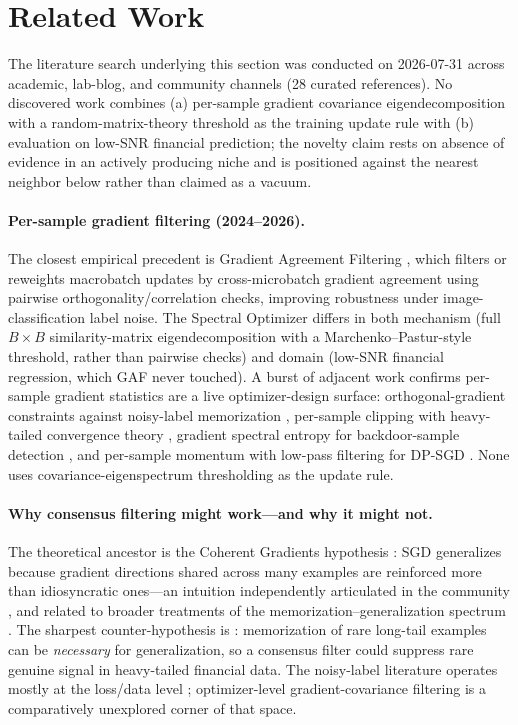 \section{Related Work}
\label{sec:related-work}

The literature search underlying this section was conducted on 2026-07-31
across academic, lab-blog, and community channels (28 curated references).
No discovered work combines (a) per-sample gradient covariance
eigendecomposition with a random-matrix-theory threshold as the training
update rule with (b) evaluation on low-SNR financial prediction; the novelty
claim rests on absence of evidence in an actively producing niche and is
positioned against the nearest neighbor below rather than claimed as a
vacuum.

\paragraph{Per-sample gradient filtering (2024--2026).}
The closest empirical precedent is Gradient Agreement Filtering
\citep{chaubard2024gradientagreementfiltering}, which filters or reweights
macrobatch updates by cross-microbatch gradient agreement using pairwise
orthogonality/correlation checks, improving robustness under
image-classification label noise. The Spectral Optimizer differs in both
mechanism (full $B \times B$ similarity-matrix eigendecomposition with a
Marchenko--Pastur-style threshold, rather than pairwise checks) and domain
(low-SNR financial regression, which GAF never touched). A burst of adjacent
work confirms per-sample gradient statistics are a live optimizer-design
surface: orthogonal-gradient constraints against noisy-label memorization
\citep{mai2026orthogonalgradient}, per-sample clipping with heavy-tailed
convergence theory \citep{nobile2026persampleclipping}, gradient spectral
entropy for backdoor-sample detection \citep{zhao2026gradsentry}, and
per-sample momentum with low-pass filtering for DP-SGD \citep{xu2025dppmlf}.
None uses covariance-eigenspectrum thresholding as the update rule.

\paragraph{Why consensus filtering might work---and why it might not.}
The theoretical ancestor is the Coherent Gradients hypothesis
\citep{chatterjee2020coherentgradients}: SGD generalizes because gradient
directions shared across many examples are reinforced more than
idiosyncratic ones---an intuition independently articulated in the community
\citep{pope2022general_circuits}, and related to broader treatments of the
memorization--generalization spectrum \citep{vaintrob2025memorization}. The
sharpest counter-hypothesis is \citet{feldman2019longtailmemorization}:
memorization of rare long-tail examples can be \emph{necessary} for
generalization, so a consensus filter could suppress rare genuine signal in
heavy-tailed financial data. The noisy-label literature operates mostly at
the loss/data level \citep{liu2020earlylearningregularization,
liang2022noisylabelsurvey, song2025labelnoisesurvey}; optimizer-level
gradient-covariance filtering is a comparatively unexplored corner of that
space.

